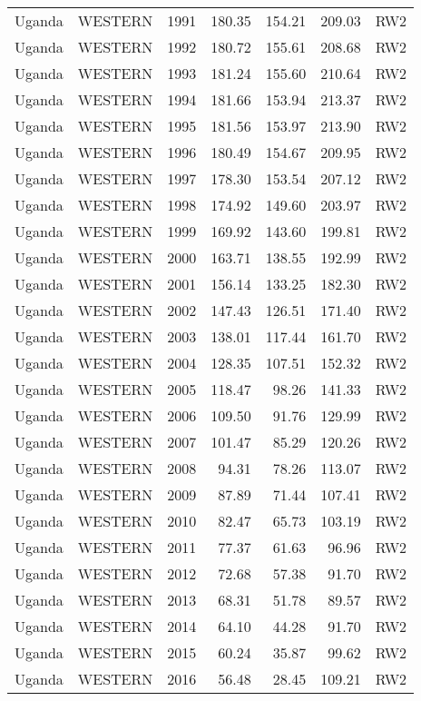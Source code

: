 \begin{longtable}{lllrrrl}
  Uganda & WESTERN & 1991 & 180.35 & 154.21 & 209.03 & RW2 \\ 
  Uganda & WESTERN & 1992 & 180.72 & 155.61 & 208.68 & RW2 \\ 
  Uganda & WESTERN & 1993 & 181.24 & 155.60 & 210.64 & RW2 \\ 
  Uganda & WESTERN & 1994 & 181.66 & 153.94 & 213.37 & RW2 \\ 
  Uganda & WESTERN & 1995 & 181.56 & 153.97 & 213.90 & RW2 \\ 
  Uganda & WESTERN & 1996 & 180.49 & 154.67 & 209.95 & RW2 \\ 
  Uganda & WESTERN & 1997 & 178.30 & 153.54 & 207.12 & RW2 \\ 
  Uganda & WESTERN & 1998 & 174.92 & 149.60 & 203.97 & RW2 \\ 
  Uganda & WESTERN & 1999 & 169.92 & 143.60 & 199.81 & RW2 \\ 
  Uganda & WESTERN & 2000 & 163.71 & 138.55 & 192.99 & RW2 \\ 
  Uganda & WESTERN & 2001 & 156.14 & 133.25 & 182.30 & RW2 \\ 
  Uganda & WESTERN & 2002 & 147.43 & 126.51 & 171.40 & RW2 \\ 
  Uganda & WESTERN & 2003 & 138.01 & 117.44 & 161.70 & RW2 \\ 
  Uganda & WESTERN & 2004 & 128.35 & 107.51 & 152.32 & RW2 \\ 
  Uganda & WESTERN & 2005 & 118.47 & 98.26 & 141.33 & RW2 \\ 
  Uganda & WESTERN & 2006 & 109.50 & 91.76 & 129.99 & RW2 \\ 
  Uganda & WESTERN & 2007 & 101.47 & 85.29 & 120.26 & RW2 \\ 
  Uganda & WESTERN & 2008 & 94.31 & 78.26 & 113.07 & RW2 \\ 
  Uganda & WESTERN & 2009 & 87.89 & 71.44 & 107.41 & RW2 \\ 
  Uganda & WESTERN & 2010 & 82.47 & 65.73 & 103.19 & RW2 \\ 
  Uganda & WESTERN & 2011 & 77.37 & 61.63 & 96.96 & RW2 \\ 
  Uganda & WESTERN & 2012 & 72.68 & 57.38 & 91.70 & RW2 \\ 
  Uganda & WESTERN & 2013 & 68.31 & 51.78 & 89.57 & RW2 \\ 
  Uganda & WESTERN & 2014 & 64.10 & 44.28 & 91.70 & RW2 \\ 
  Uganda & WESTERN & 2015 & 60.24 & 35.87 & 99.62 & RW2 \\ 
  Uganda & WESTERN & 2016 & 56.48 & 28.45 & 109.21 & RW2 \\ 

\end{longtable}
